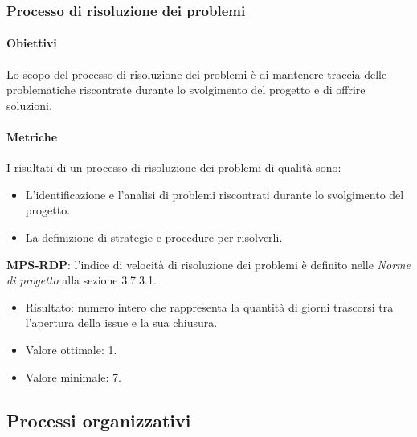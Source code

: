 \documentclass[../piano-di-qualifica.tex]{subfiles}
\begin{document}
\subsubsection{Processo di risoluzione dei problemi}%
\label{subs:processo_di_risoluzione_dei_problemi}

\paragraph{Obiettivi}%
\label{par:obiettivi}

Lo scopo del processo di risoluzione dei problemi è di mantenere traccia delle problematiche riscontrate durante lo svolgimento del progetto e di offrire soluzioni.


\paragraph{Metriche}%
\label{par:metriche}

I risultati di un processo di risoluzione dei problemi di qualità sono:
\begin{itemize}

  \item L'identificazione e l'analisi di problemi riscontrati durante lo svolgimento del progetto.
  \item La definizione di strategie e procedure per risolverli.
\end{itemize}

\textbf{MPS-RDP}: l'indice di velocità di risoluzione dei problemi è definito nelle \textit{Norme di progetto} alla sezione 3.7.3.1.
\begin{itemize}
  \item Risultato: numero intero che rappresenta la quantità di giorni trascorsi tra l'apertura della issue e la sua chiusura.
  \item Valore ottimale: 1.
  \item Valore minimale: 7.
\end{itemize}


\subsection{Processi organizzativi}%
\label{sub:processi_organizzativi}
\end{document}
